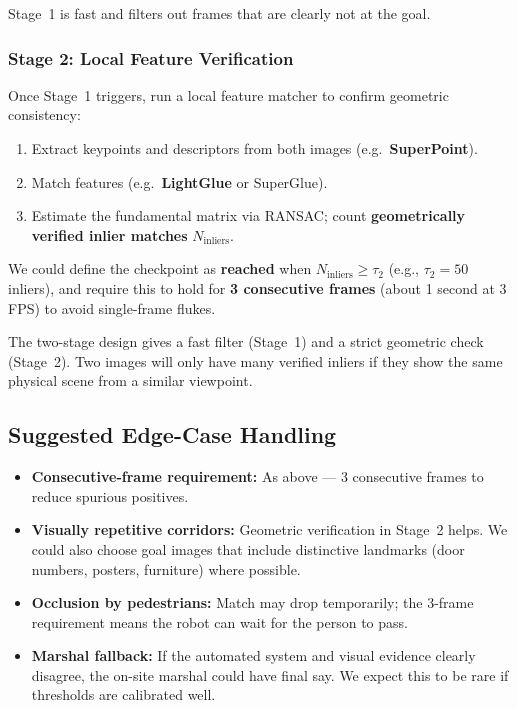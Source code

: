 \documentclass[11pt,a4paper]{article}
\begin{document}
Stage~1 is fast and filters out frames that are clearly not at the goal.

\subsubsection{Stage 2: Local Feature Verification}

Once Stage~1 triggers, run a local feature matcher to confirm geometric consistency:

\begin{enumerate}[nosep]
    \item Extract keypoints and descriptors from both images (e.g.\ \textbf{SuperPoint}).
    \item Match features (e.g.\ \textbf{LightGlue} or SuperGlue).
    \item Estimate the fundamental matrix via RANSAC; count \textbf{geometrically verified inlier matches} $N_{\text{inliers}}$.
\end{enumerate}

We could define the checkpoint as \textbf{reached} when $N_{\text{inliers}} \geq \tau_2$ (e.g., $\tau_2 = 50$ inliers), and require this to hold for \textbf{3 consecutive frames} (about 1 second at 3 FPS) to avoid single-frame flukes.

The two-stage design gives a fast filter (Stage~1) and a strict geometric check (Stage~2). Two images will only have many verified inliers if they show the same physical scene from a similar viewpoint.

\subsection{Suggested Edge-Case Handling}

\begin{itemize}
    \item \textbf{Consecutive-frame requirement:} As above --- 3 consecutive frames to reduce spurious positives.
    \item \textbf{Visually repetitive corridors:} Geometric verification in Stage~2 helps. We could also choose goal images that include distinctive landmarks (door numbers, posters, furniture) where possible.
    \item \textbf{Occlusion by pedestrians:} Match may drop temporarily; the 3-frame requirement means the robot can wait for the person to pass.
    \item \textbf{Marshal fallback:} If the automated system and visual evidence clearly disagree, the on-site marshal could have final say. We expect this to be rare if thresholds are calibrated well.
\end{itemize}
\end{document}
